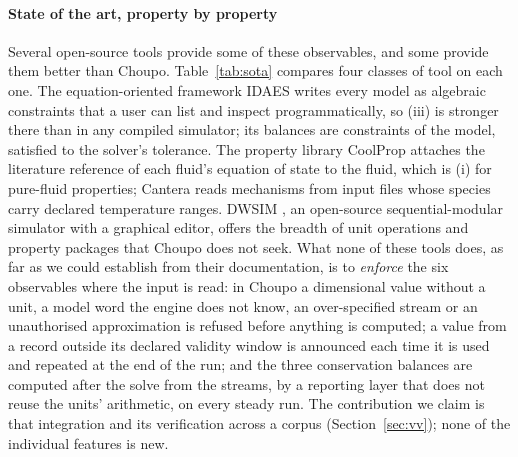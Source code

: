 \documentclass[preprint,12pt]{elsarticle}
\begin{document}
\paragraph{State of the art, property by property}  Several open-source
tools provide some of these observables, and some provide them better than
Choupo.  Table~\ref{tab:sota} compares four classes of tool on each one.
The equation-oriented framework IDAES \citep{lee2021} writes every model as
algebraic constraints that a user can list and inspect programmatically,
so (iii) is stronger there than in any compiled simulator; its balances
are constraints of the model, satisfied to the solver's tolerance.  The
property library CoolProp \citep{bell2014} attaches the literature
reference of each fluid's equation of state to the fluid, which is (i)
for pure-fluid properties; Cantera \citep{cantera} reads mechanisms from
input files whose species carry declared temperature ranges.  DWSIM
\citep{dwsim}, an open-source sequential-modular simulator with a
graphical editor, offers the breadth of unit operations and property
packages that Choupo does not seek.  What none of these tools does, as far
as we could establish from their documentation, is to \emph{enforce} the
six observables where the input is read: in Choupo a dimensional value
without a unit, a model word the engine does not know, an over-specified
stream or an unauthorised approximation is refused before anything is
computed; a value from a record outside its declared validity window is
announced each time it is used and repeated at the end of the run; and the
three conservation balances are computed after the solve from the streams,
by a reporting layer that does not reuse the units' arithmetic, on every
steady run.  The contribution we claim is that integration and its
verification across a corpus (Section~\ref{sec:vv}); none of the
individual features is new.
\end{document}
